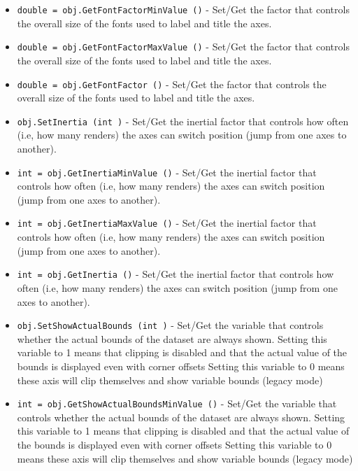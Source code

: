 \begin{itemize}
\item  \verb|double = obj.GetFontFactorMinValue ()| -  Set/Get the factor that controls the overall size of the fonts used
 to label and title the axes. 

\item  \verb|double = obj.GetFontFactorMaxValue ()| -  Set/Get the factor that controls the overall size of the fonts used
 to label and title the axes. 

\item  \verb|double = obj.GetFontFactor ()| -  Set/Get the factor that controls the overall size of the fonts used
 to label and title the axes. 

\item  \verb|obj.SetInertia (int )| -  Set/Get the inertial factor that controls how often (i.e, how
 many renders) the axes can switch position (jump from one axes 
 to another).

\item  \verb|int = obj.GetInertiaMinValue ()| -  Set/Get the inertial factor that controls how often (i.e, how
 many renders) the axes can switch position (jump from one axes 
 to another).

\item  \verb|int = obj.GetInertiaMaxValue ()| -  Set/Get the inertial factor that controls how often (i.e, how
 many renders) the axes can switch position (jump from one axes 
 to another).

\item  \verb|int = obj.GetInertia ()| -  Set/Get the inertial factor that controls how often (i.e, how
 many renders) the axes can switch position (jump from one axes 
 to another).

\item  \verb|obj.SetShowActualBounds (int )| -  Set/Get the variable that controls whether the actual
 bounds of the dataset are always shown. Setting this variable
 to 1 means that clipping is disabled and that the actual
 value of the bounds is displayed even with corner offsets
 Setting this variable to 0 means these axis will clip
 themselves and show variable bounds (legacy mode)

\item  \verb|int = obj.GetShowActualBoundsMinValue ()| -  Set/Get the variable that controls whether the actual
 bounds of the dataset are always shown. Setting this variable
 to 1 means that clipping is disabled and that the actual
 value of the bounds is displayed even with corner offsets
 Setting this variable to 0 means these axis will clip
 themselves and show variable bounds (legacy mode)


\end{itemize}
